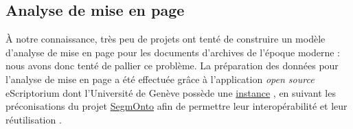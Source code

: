 \documentclass[final, fra]{anthology-ch}     %
\begin{document}
\begin{table}[h]
    \centering
    \caption{\label{tab:corpus}
    Corpus de travail et échantillons retenus pour l'entraînement du modèle d'ATR.
    }
\end{table}

\subsection{Analyse de mise en page}
À notre connaissance, très peu de projets ont tenté de construire un modèle d'analyse de mise en page pour les documents d'archives de l'époque moderne \cite{koolen_republic_2023,loraine-chappuis-ile-de-france}: nous avons donc tenté de pallier ce problème. La préparation des données pour l'analyse de mise en page a été effectuée grâce à l'application \textit{open source} eScriptorium \cite{escriptorium-an-open-source-platform} dont l'Université de Genève possède une \href{https://www.unige.ch/lettres/humanites-numeriques/recherche/projets/projets-de-la-chaire/fondue}{instance} \cite{fondue-2021}, en suivant les préconisations du projet \href{segmonto.github.io}{SegmOnto} \cite{segmonto-a-controlled-vocsbulary-to-describe-and-process-digital-facsimilies} afin de permettre leur interopérabilité et leur réutilisation \cite{htr-united-a-solution-towards-a-common}. 
\end{document}
